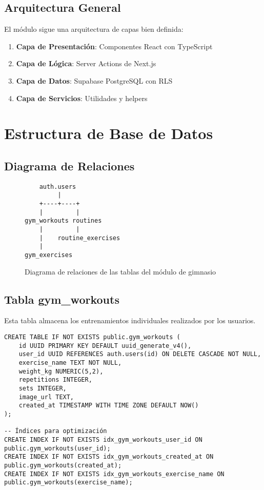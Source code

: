 \documentclass[12pt,a4paper]{article}
\begin{document}
\subsection{Arquitectura General}

El módulo sigue una arquitectura de capas bien definida:

\begin{enumerate}
    \item \textbf{Capa de Presentación}: Componentes React con TypeScript
    \item \textbf{Capa de Lógica}: Server Actions de Next.js
    \item \textbf{Capa de Datos}: Supabase PostgreSQL con RLS
    \item \textbf{Capa de Servicios}: Utilidades y helpers
\end{enumerate}

\section{Estructura de Base de Datos}

\subsection{Diagrama de Relaciones}

\begin{figure}[H]
\centering
\begin{verbatim}
    auth.users
         |
    +----+----+
    |         |
gym_workouts routines
    |         |
    |    routine_exercises
    |
gym_exercises
\end{verbatim}
\caption{Diagrama de relaciones de las tablas del módulo de gimnasio}
\end{figure}

\subsection{Tabla gym\_workouts}

Esta tabla almacena los entrenamientos individuales realizados por los usuarios.

\begin{lstlisting}[style=sqlstyle, caption=Estructura completa de gym_workouts]
CREATE TABLE IF NOT EXISTS public.gym_workouts (
    id UUID PRIMARY KEY DEFAULT uuid_generate_v4(),
    user_id UUID REFERENCES auth.users(id) ON DELETE CASCADE NOT NULL,
    exercise_name TEXT NOT NULL,
    weight_kg NUMERIC(5,2),
    repetitions INTEGER,
    sets INTEGER,
    image_url TEXT,
    created_at TIMESTAMP WITH TIME ZONE DEFAULT NOW()
);

-- Índices para optimización
CREATE INDEX IF NOT EXISTS idx_gym_workouts_user_id ON public.gym_workouts(user_id);
CREATE INDEX IF NOT EXISTS idx_gym_workouts_created_at ON public.gym_workouts(created_at);
CREATE INDEX IF NOT EXISTS idx_gym_workouts_exercise_name ON public.gym_workouts(exercise_name);
\end{lstlisting}
\end{document}
